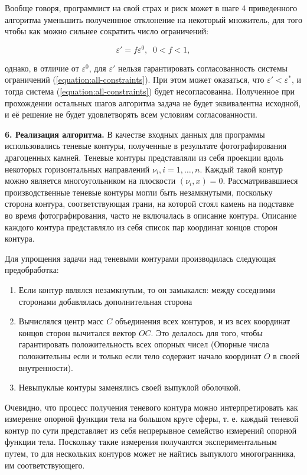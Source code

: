 \documentclass[a4paper, 10pt]{article}
\theoremstyle{definition}
\theoremstyle{plain}
\theoremstyle{plain}
\begin{document}
Вообще говоря, программист на свой страх и риск может в шаге 4 приведенного
алгоритма уменьшить полученнное отклонение на некоторый множитель, для того
чтобы как можно сильнее сократить число ограничений:

\begin{equation*}
 \varepsilon' = f \varepsilon^{0}, \;\; 0 < f < 1,
\end{equation*}

однако, в отличие от $\varepsilon^{0}$, для $\varepsilon'$ нельзя
гарантировать согласованность системы ограничений
(\ref{equation:all-constraints}). При этом может оказаться, что
$\varepsilon' < \varepsilon^{*}$, и тогда система
(\ref{equation:all-constraints}) будет несогласованна. Полученное при
прохождении остальных шагов алгоритма задача не будет эквивалентна
исходной, и её решение не будет удовлетворять всем условиям согласованности.

\textbf{6. Реализация алгоритма.} В качестве входных данных для программы
использовались теневые контуры, полученные в результате фотографирования
драгоценных камней. Теневые контуры представляли из себя проекции вдоль
некоторых горизонтальных направлений $\nu_{i}, i = 1, \ldots, n$. Каждый такой
контур можно является многоугольником на плоскости $(\nu_{i}, x) = 0$.
Рассматривавшиеся производственные теневые контуры могли быть незамкнутыми,
поскольку сторона контура, соответствующая грани, на которой стоял камень на
подставке во время фотографирования, часто не включалась в описание контура.
Описание каждого контура представляло из себя список пар координат концов сторон
контура.

Для упрощения задачи над теневыми контурами производилась следующая
предобработка:

\begin{enumerate}
 \item Если контур являлся незамкнутым, то он замыкался: между соседними
 сторонами добавлялась дополнительная сторона
 \item Вычислялся центр масс $C$ объединения всех контуров, и из всех координат
 концов сторон вычитался вектор $OC$. Это делалось для того, чтобы гарантировать
 положительность всех опорных чисел (Опорные числа положительны если и только
 если тело содержит начало координат $O$ в своей внутренности).
 \item Невыпуклые контуры заменялись своей выпуклой оболочкой.
\end{enumerate}

Очевидно, что процесс получения теневого контура можно интерпретировать как
измерение опорной функции тела на большом круге сферы, т. е. каждый теневой
контур по сути представляет из себя непрерывное семейство измерений опорной
функции тела. Поскольку такие измерения получаются экспериментальным путем, то
для нескольких контуров может не найтись выпуклого многогранника, им
соответствующего.
\end{document}
